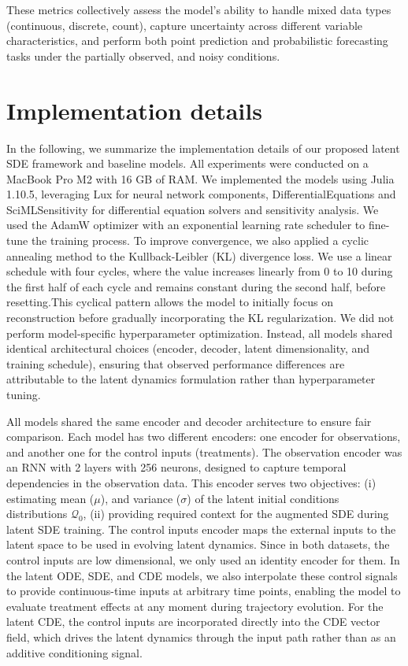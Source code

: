 \documentclass[preprint,12pt]{elsarticle}
\begin{document}
These metrics collectively assess the model's ability to handle mixed data types (continuous, discrete, count), capture uncertainty across different variable characteristics, and perform both point prediction and probabilistic forecasting tasks under the partially observed, and noisy conditions. 


\section{Implementation details}

In the following, we summarize the implementation details of our proposed latent SDE framework and baseline models. 
All experiments were conducted on a MacBook Pro M2 with 16 GB of RAM. We implemented the models using Julia 1.10.5, leveraging Lux for neural network components, DifferentialEquations and SciMLSensitivity for differential equation solvers and sensitivity analysis.
We used the AdamW optimizer with an exponential learning rate scheduler to fine-tune the training process. To improve convergence, we also applied a cyclic annealing method to the Kullback-Leibler (KL) divergence loss. We use a linear schedule with four cycles, where the value increases linearly from 0 to 10 during the first half of each cycle and remains constant during the second half, before resetting.This cyclical pattern allows the model to initially focus on reconstruction before gradually incorporating the KL regularization.
We did not perform model-specific hyperparameter optimization. Instead, all models shared identical architectural choices (encoder, decoder, latent dimensionality, and training schedule), ensuring that observed performance differences are attributable to the latent dynamics formulation rather than hyperparameter tuning.

All models shared the same encoder and decoder architecture to ensure fair comparison. Each model has two different encoders: one encoder for observations, and another one for the control inputs (treatments). The observation encoder was an RNN with 2 layers with 256 neurons, designed to capture temporal dependencies in the observation data. This encoder serves two objectives: (i) estimating mean ($\mu$), and variance ($\sigma$) of the latent initial conditions distributions $\mathcal{Q}_0$, (ii) providing required context for the augmented SDE during latent SDE training. 
The control inputs encoder maps the external inputs to the latent space to be used in evolving latent dynamics. Since in both datasets, the control inputs are low dimensional, we only used an identity encoder for them. In the latent ODE, SDE, and CDE models, we also interpolate these control signals to provide continuous-time inputs at arbitrary time points, enabling the model to evaluate treatment effects at any moment during trajectory evolution. For the latent CDE, the control inputs are incorporated directly into the CDE vector field, which drives the latent dynamics through the input path rather than as an additive conditioning signal.
\end{document}

